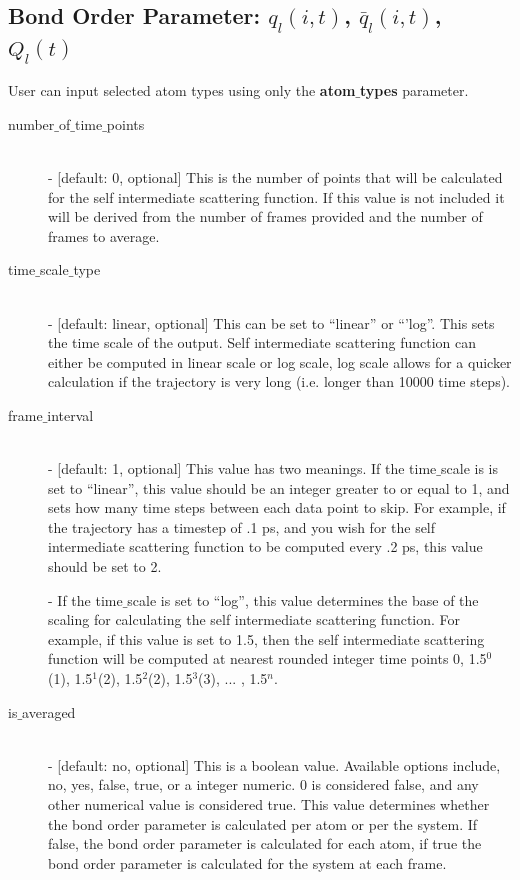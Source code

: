 \documentclass{article}
\begin{document}
\subsection{Bond Order Parameter: $q_l(i,t)$, $\bar{q}_l(i,t)$, $Q_l(t)$} \label{sec::BOP_parm}
User can input selected atom types using only the \textbf{atom$\_$types} parameter.
\begin{description}	
	\item[number$\_$of$\_$time$\_$points]\hfill \\
	- [default: 0, optional] This is the number of points that will be calculated for the self intermediate scattering function.  If this value is not included it will be derived from the number of frames provided and the number of frames to average.
	
	\item[time$\_$scale$\_$type] \hfill \\
	- [default: linear, optional] This can be set to ``linear'' or ``'log''.  This sets the time scale of the output. Self intermediate scattering function can either be computed in linear scale or log scale, log scale allows for a quicker calculation if the trajectory is very long (i.e. longer than 10000 time steps).
	
	\item[frame$\_$interval] \hfill \\
	- [default: 1, optional] This value has two meanings.  If the time$\_$scale is is set to ``linear'', this value should be an integer greater to or equal to 1, and sets how many time steps between each data point to skip.  For example, if the trajectory has a timestep of .1 ps, and you wish for the self intermediate scattering function to be computed every .2 ps, this value should be set to 2. 
	
	- If the time$\_$scale is set to ``log'', this value determines the base of the scaling for calculating the self intermediate scattering function.  For example, if this value is set to 1.5, then the self intermediate scattering function will be computed at nearest rounded integer time points 0, 1.5$^0$(1), 1.5$^1$(2), 1.5$^2$(2), 1.5$^3$(3), ... , 1.5$^{n}$. 
	
	\item[is$\_$averaged] \hfill \\
	- [default: no, optional]  This is a boolean value.  Available options include, no, yes, false, true, or a integer numeric.  0 is considered false, and any other numerical value is considered true.  This value determines whether the bond order parameter is calculated per atom or per the system.  If false, the bond order parameter is calculated for each atom, if true the bond order parameter is calculated for the system at each frame.
	

\end{description}
\end{document}
